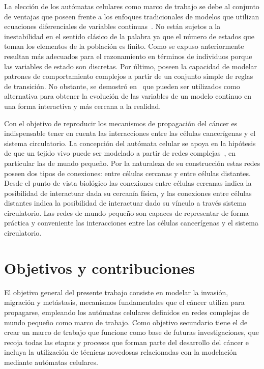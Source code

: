 La elecci\'on de los aut\'omatas celulares como marco de trabajo se debe al conjunto de ventajas que poseen frente a los enfoques tradicionales de modelos que utilizan ecuaciones diferenciales de variables continuas~\cite{guinot}. No est\'an sujetos a la inestabilidad en el sentido cl\'asico de la palabra ya que el n\'umero de estados que toman los elementos de la poblaci\'on es finito. Como se expuso anteriormente resultan m\'as adecuados para el razonamiento en t\'erminos de individuos porque las variables de estado son discretas. Por \'ultimo, poseen la capacidad de modelar patrones de comportamiento complejos a partir de un conjunto simple de reglas de transici\'on. No obstante, se demostr\'o en~\cite{ruben} que pueden ser utilizados como alternativa para obtener la evoluci\'on de las variables de un modelo continuo en una forma interactiva y m\'as cercana a la realidad. 

Con el objetivo de reproducir los mecanismos de propagaci\'on del c\'ancer es indispensable tener en cuenta las interacciones entre las c\'elulas cancer\'igenas y el sistema circulatorio. La concepci\'on del aut\'omata celular se apoya en la hip\'otesis de que un tejido vivo puede ser modelado a partir de redes complejas~\cite{complexnetworks}, en particular las de mundo peque\~no. Por la naturaleza de su construcci\'on estas redes poseen dos tipos de conexiones: entre c\'elulas cercanas y entre c\'elulas distantes. Desde el punto de vista biol\'ogico las conexiones entre c\'elulas cercanas indica la posibilidad de interactuar dada su cercan\'ia f\'isica, y las conexiones entre c\'elulas distantes indica la posibilidad de interactuar dado su v\'inculo a trav\'es sistema circulatorio. Las redes de mundo peque\~no son capaces de representar de forma pr\'actica y conveniente las interacciones entre las c\'elulas cancer\'igenas y el sistema circulatorio.

\section{Objetivos y contribuciones}
El objetivo general del presente trabajo consiste en modelar la invasi\'on, migraci\'on y met\'astasis, mecanismos fundamentales que el c\'ancer utiliza para propagarse, empleando los aut\'omatas celulares definidos en redes complejas de mundo peque\~no como marco de trabajo. Como objetivo secundario tiene el de crear un marco de trabajo que funcione como base de futuras investigaciones, que recoja todas las etapas y procesos que forman parte del desarrollo del c\'ancer e incluya la utilizaci\'on de t\'ecnicas novedosas relacionadas con la modelaci\'on mediante aut\'omatas celulares.

